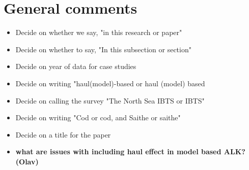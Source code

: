 \documentclass[a4paper 12pt]{article}
\numberwithin{equation}{section}
\begin{document}
%
%


\clearpage
\section{General comments}

\begin{itemize}
\item Decide on whether we say, "in this research or paper"
\item Decide on whether to say, "In this subsection or section"
\item Decide on year of data for case studies
\item Decide on writing "haul(model)-based or haul (model) based
\item Decide on calling the survey "The North Sea IBTS or IBTS"
\item Decide on writing "Cod or cod, and Saithe or saithe"
\item Decide on a title for the paper
\item {\bf what are issues with including haul effect in model based ALK?
 (Olav)}
 
\end{itemize}
\end{document}
